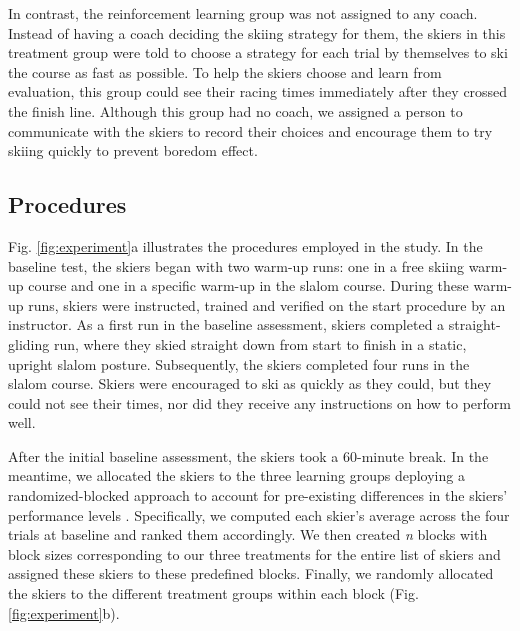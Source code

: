 \documentclass[pdflatex,sn-nature]{sn-jnl}%
\theoremstyle{thmstyleone}%
\theoremstyle{thmstyletwo}%
\theoremstyle{thmstylethree}%
\begin{document}
In contrast, the reinforcement learning group was not assigned to any coach. Instead of having a coach deciding the skiing strategy for them, the skiers in this treatment group were told to choose a strategy for each trial by themselves to ski the course as fast as possible. To help the skiers choose and learn from evaluation, this group could see their racing times immediately after they crossed the finish line. Although this group had no coach, we assigned a person to communicate with the skiers to record their choices and encourage them to try skiing quickly to prevent boredom effect.

\subsection{Procedures}\label{procedure}
Fig. \ref{fig:experiment}a illustrates the procedures employed in the study. 
In the baseline test, the skiers began with two warm-up runs: one in a free skiing warm-up course and one in a specific warm-up in the slalom course. During these warm-up runs, skiers were instructed, trained and verified on the start procedure by an instructor. As a first run in the baseline assessment, skiers completed a straight-gliding run, where they skied straight down from start to finish in a static, upright slalom posture. Subsequently, the skiers completed four runs in the slalom course. Skiers were encouraged to ski as quickly as they could, but they could not see their times, nor did they receive any instructions on how to perform well.

After the initial baseline assessment, the skiers took a 60-minute break. In the meantime, we allocated the skiers to the three learning groups deploying a randomized-blocked approach to account for pre-existing differences in the skiers’ performance levels \cite{maxwell_designing_2017}. Specifically, we computed each skier’s average across the four trials at baseline and ranked them accordingly. We then created \textit{n} blocks with block sizes corresponding to our three treatments for the entire list of skiers and assigned these skiers to these predefined blocks. Finally, we randomly allocated the skiers to the different treatment groups within each block (Fig. \ref{fig:experiment}b).
\end{document}
